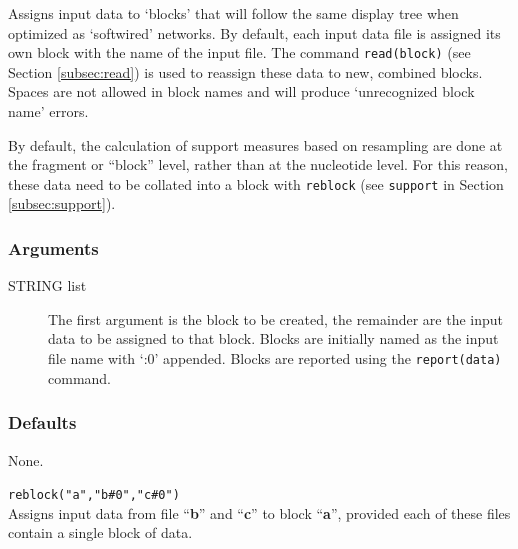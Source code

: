 	\begin{phygdescription}
		{Assigns input data to `blocks' that will follow the same display tree when optimized
		as `softwired' networks. By default, each input data file is assigned its own block with 
		the name of the input file. The command \texttt{read(block)} (see Section \ref{subsec:read}) 
		is used to reassign these data to new, combined blocks. Spaces are not allowed in 
		block names and will produce `unrecognized block name' errors.
		
		By default, the calculation of support measures based on resampling are done at the 
		fragment or ``block'' level, rather than at the nucleotide level. For this reason, these 
		data need to be collated into a block with \texttt{reblock} (see \texttt{support} in Section 
		\ref{subsec:support}).} 
	\end{phygdescription}
	
	\subsubsection{Arguments}
	\begin{description}
	
		\item [STRING list] The first argument is the block to be created, the remainder 
		are the input data to be assigned to that block. Blocks are initially named as the input 
		file name with `:0' appended. Blocks are reported using the \texttt{report(data)} command.
		
	\end{description}

	\subsubsection{Defaults}
		None.
	
	\begin{example}

		\item{\texttt{reblock("a","b\#0","c\#0")}\\ Assigns input data from file ``\textbf{b}'' and 
		``\textbf{c}'' to block ``\textbf{a}'', provided each of these files contain a single block 
		of data.}
	
	\end{example}

